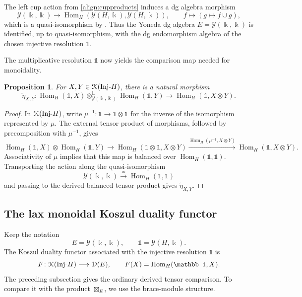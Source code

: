 \documentclass[a4paper, 11pt]{amsart}
\newtheorem{prop}[thm]{Proposition}
\theoremstyle{definition}
\theoremstyle{remark}
\numberwithin{equation}{section}
\newcommand{\Y}{\mathcal{Y}}
\newcommand{\ED}{\EuScript{D}}
\newcommand{\EK}{\EuScript{K}}
\begin{document}
The left cup action from \eqref{align:cupproducts} induces a dg algebra morphism
\[
\Y(\Bbbk,\Bbbk)
\longrightarrow
\operatorname{Hom}_H(\Y(H,\Bbbk),\Y(H,\Bbbk)),
\qquad
f\longmapsto(g\longmapsto f\cup g),
\]
which is a quasi-isomorphism by \cite[Proposition 3.11]{ChWa1}. Thus the Yoneda dg algebra $E=\Y(\Bbbk,\Bbbk)$ is identified, up to quasi-isomorphism, with the dg endomorphism algebra of the chosen injective resolution $\mathbb 1$.

The multiplicative resolution $\mathbb 1$ now yields the comparison map needed for monoidality.
\begin{prop}\label{prop:naturaltrans}
For $X,Y\in\EK(\mathrm{Inj}\text{-}H)$, there is a natural morphism
\[
\widetilde\eta_{X,Y}\colon
\operatorname{Hom}_H(\mathbb 1,X)
\otimes^{\mathbb L}_{\Y(\Bbbk,\Bbbk)}
\operatorname{Hom}_H(\mathbb 1,Y)
\longrightarrow
\operatorname{Hom}_H(\mathbb 1,X\otimes Y).
\]
\end{prop}
\begin{proof}
In $\EK(\mathrm{Inj}\text{-}H)$, write $\mu^{-1}\colon\mathbb 1\to\mathbb 1\otimes\mathbb 1$ for the inverse of the isomorphism represented by $\mu$. The external tensor product of morphisms, followed by precomposition with $\mu^{-1}$, gives
\[
\operatorname{Hom}_H(\mathbb 1,X)\otimes\operatorname{Hom}_H(\mathbb 1,Y)
\longrightarrow
\operatorname{Hom}_H(\mathbb 1\otimes\mathbb 1,X\otimes Y)
\xrightarrow{\operatorname{Hom}_H(\mu^{-1},X\otimes Y)}
\operatorname{Hom}_H(\mathbb 1,X\otimes Y).
\]
Associativity of $\mu$ implies that this map is balanced over
$\operatorname{Hom}_H(\mathbb 1,\mathbb 1)$. Transporting the action along the quasi-isomorphism
\[
\Y(\Bbbk,\Bbbk)\xrightarrow{\simeq}\operatorname{Hom}_H(\mathbb 1,\mathbb 1)
\]
and passing to the derived balanced tensor product gives $\widetilde\eta_{X,Y}$.
\end{proof}

\subsection{The lax monoidal Koszul duality functor}
Keep the notation
\[
E=\Y(\Bbbk,\Bbbk),
\qquad
\mathbb 1=\Y(H,\Bbbk).
\]
The Koszul duality functor associated with the injective resolution $\mathbb 1$ is
\[
F\colon\EK(\mathrm{Inj}\text{-}H)\longrightarrow\ED(E),
\qquad
F(X)=\operatorname{Hom}_H(\mathbb 1,X).
\]
The preceding subsection gives the ordinary derived tensor comparison. To compare it with the product $\boxtimes_E$, we use the brace-module structure.
\end{document}

